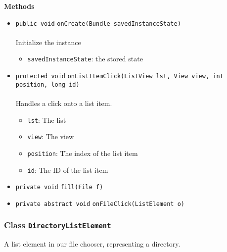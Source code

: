 \textbf{\sffamily Methods}
\begin{itemize}
\item \lstinline|public void| \lstinline|onCreate|\lstinline|(Bundle savedInstanceState)|\\ \\[-0.6em]
Initialize the instance
\begin{itemize}
\item \lstinline|savedInstanceState|: the stored state
\end{itemize}



\item \lstinline|protected void| \lstinline|onListItemClick|\lstinline|(ListView lst, View view, int position, long id)|\\ \\[-0.6em]
Handles a click onto a list item.
\begin{itemize}
\item \lstinline|lst|: The list
\item \lstinline|view|: The view
\item \lstinline|position|: The index of the list item
\item \lstinline|id|: The ID of the list item
\end{itemize}



\item \lstinline|private void| \lstinline|fill|\lstinline|(File f)| \\[-0.6em]




\item \lstinline|private abstract void| \lstinline|onFileClick|\lstinline|(ListElement o)| \\[-0.6em]




\end{itemize}

\subsubsection{Class \lstinline|DirectoryListElement|}
A list element in our file chooser, representing a directory. \\
\noindent\begin{minipage}[t]{5cm}
\vspace{0.3em}
\hspace*{2em}
\vspace{0.3em}
\end{minipage}



